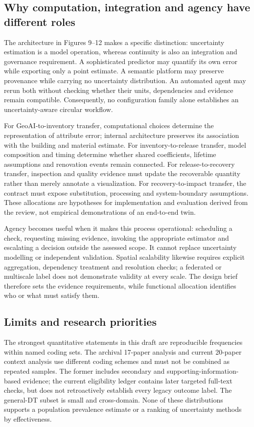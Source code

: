 \subsection{Why computation, integration and agency have different roles}
The architecture in Figures 9–12 makes a specific distinction: uncertainty estimation is a model operation, whereas continuity is also an integration and governance requirement. A sophisticated predictor may quantify its own error while exporting only a point estimate. A semantic platform may preserve provenance while carrying no uncertainty distribution. An automated agent may rerun both without checking whether their units, dependencies and evidence remain compatible. Consequently, no configuration family alone establishes an uncertainty-aware circular workflow.

For GeoAI-to-inventory transfer, computational choices determine the representation of attribute error; internal architecture preserves its association with the building and material estimate. For inventory-to-release transfer, model composition and timing determine whether shared coefficients, lifetime assumptions and renovation events remain connected. For release-to-recovery transfer, inspection and quality evidence must update the recoverable quantity rather than merely annotate a visualization. For recovery-to-impact transfer, the contract must expose substitution, processing and system-boundary assumptions. These allocations are hypotheses for implementation and evaluation derived from the review, not empirical demonstrations of an end-to-end twin.

Agency becomes useful when it makes this process operational: scheduling a check, requesting missing evidence, invoking the appropriate estimator and escalating a decision outside the assessed scope. It cannot replace uncertainty modelling or independent validation. Spatial scalability likewise requires explicit aggregation, dependency treatment and resolution checks; a federated or multiscale label does not demonstrate validity at every scale. The design brief therefore sets the evidence requirements, while functional allocation identifies who or what must satisfy them.


\subsection{Limits and research priorities}
The strongest quantitative statements in this draft are reproducible frequencies within named coding sets. The archival 17-paper analysis and current 20-paper context analysis use different coding schemes and must not be combined as repeated samples. The former includes secondary and supporting-information-based evidence; the current eligibility ledger contains later targeted full-text checks, but does not retroactively establish every legacy outcome label. The general-DT subset is small and cross-domain. None of these distributions supports a population prevalence estimate or a ranking of uncertainty methods by effectiveness.

